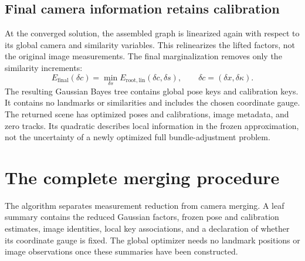 \documentclass[11pt,letterpaper]{article}
\newcommand{\code}[1]{\texttt{\detokenize{#1}}}
\begin{document}
\subsection{Final camera information retains calibration}
At the converged solution, the assembled graph is linearized again with respect
to its global camera and similarity variables. This relinearizes the lifted
factors, not the original image measurements. The final marginalization removes
only the similarity increments:
\begin{equation}
 E_{\mathrm{final}}(\delta c)
 =\min_{\delta s} E_{\mathrm{root,lin}}(\delta c,\delta s),\qquad
 \delta c=(\delta x,\delta\kappa).
\end{equation}
The resulting Gaussian Bayes tree contains global \code{X(i)} pose keys and
\code{K(i)} calibration keys. It contains no landmarks or similarities and
includes the chosen coordinate gauge. The returned scene has optimized poses
and calibrations, image metadata, and zero tracks. Its quadratic describes
local information in the frozen approximation, not the uncertainty of a newly
optimized full bundle-adjustment problem.

\newpage
\section{The complete merging procedure}
The algorithm separates measurement reduction from camera merging. A leaf
summary contains the reduced Gaussian factors, frozen pose and calibration
estimates, image identities, local key associations, and a declaration of whether
its coordinate gauge is fixed. The global optimizer needs no landmark positions
or image observations once these summaries have been constructed.
\end{document}
